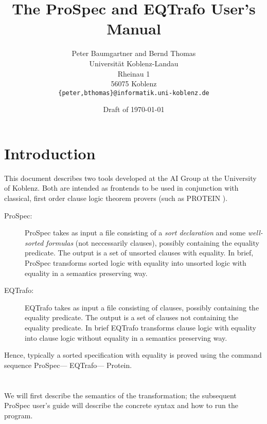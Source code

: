 \documentclass[fleqn]{scrartcl}
\newcommand{\prospec}{\textsf{ProSpec}\xspace}
\newcommand{\eqtrafo}{\textsf{EQTrafo}\xspace}
\begin{document}


\title{The \prospec and \eqtrafo User's Manual}
\author{Peter Baumgartner and Bernd Thomas\\
Universit{\"a}t Koblenz-Landau\\
Rheinau 1\\
56075 Koblenz\\[2ex]
\texttt{\normalsize \{peter,bthomas\}@informatik.uni-koblenz.de}}
\date{Draft of \today}

\maketitle

\section{Introduction}
\label{sec:Introduction}
This document describes two tools developed at the AI Group at the
University of Koblenz. Both are intended  as frontends to be used in
conjunction with classical, first order clause logic theorem provers
(such as PROTEIN \cite{Baumgartner:Furbach:PROTEIN:CADE12:94}). 
\begin{description}
\item[\prospec:] \prospec takes as input a file consisting of a {\em sort
  declaration\/} and some {\em well-sorted formulas\/} (not neccessarily
  clauses), possibly containing the equality predicate. The output is 
  a set of unsorted clauses with equality. In brief, \prospec
  transforms sorted logic with equality into unsorted logic with
  equality in a semantics preserving way.


\item[\eqtrafo:] \eqtrafo takes as input a file consisting of clauses,
  possibly containing the equality predicate. The output is a set of
  clauses not containing the equality predicate. In brief \eqtrafo
  transforms clause logic with equality into clause logic without
  equality in a semantics preserving way.
\end{description}
Hence, typically a sorted specification with equality is proved using the
command sequence \prospec --- \eqtrafo --- Protein.



\section{\protect{\prospec}}
\label{sec:Prospec}
We will first describe the semantics of the transformation; the
subsequent \prospec user's guide will describe the concrete syntax and
how to run the program. 
\end{document}
